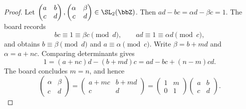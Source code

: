\begin{proof}
    Let $\begin{pmatrix}a & b\\ c & d\end{pmatrix}, \begin{pmatrix}\alpha & \beta\\ c & d\end{pmatrix} \in \SL_2(\bbZ)$. Then $ad - bc = \alpha d - \beta c = 1$. The board records
    \[
        bc \equiv 1 \equiv \beta c \pmod d, \qquad ad \equiv 1 \equiv \alpha d \pmod c,
    \]
    and obtains $b \equiv \beta \pmod d$ and $a \equiv \alpha \pmod c$. Write $\beta = b + md$ and $\alpha = a + nc$. Comparing determinants gives
    \[
        1 = (a + nc)d - (b + md)c = ad - bc + (n - m)cd.
    \]
    The board concludes $m = n$, and hence
    \[
        \begin{pmatrix}\alpha & \beta\\ c & d\end{pmatrix} = \begin{pmatrix}a + mc & b + md\\ c & d\end{pmatrix} = \begin{pmatrix}1 & m\\ 0 & 1\end{pmatrix}\begin{pmatrix}a & b\\ c & d\end{pmatrix}.
    \]
\end{proof}

